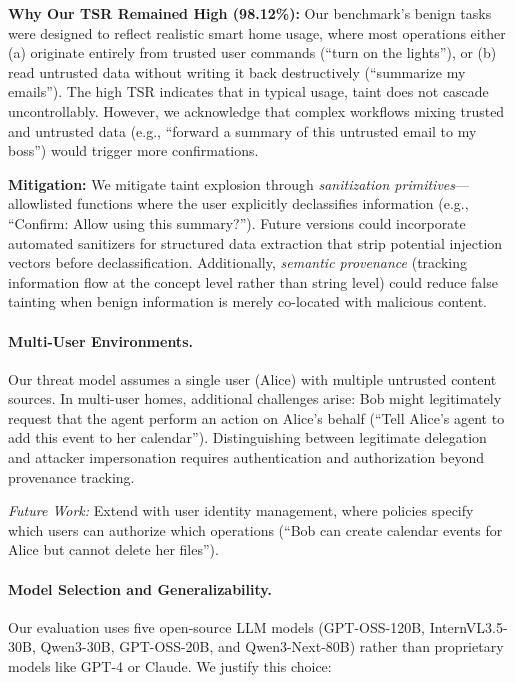 \textbf{Why Our TSR Remained High (98.12\%):} Our benchmark's benign tasks were designed to reflect realistic smart home usage, where most operations either (a) originate entirely from trusted user commands (``turn on the lights''), or (b) read untrusted data without writing it back destructively (``summarize my emails''). The high TSR indicates that in typical usage, taint does not cascade uncontrollably. However, we acknowledge that complex workflows mixing trusted and untrusted data (e.g., ``forward a summary of this untrusted email to my boss'') would trigger more confirmations.

\textbf{Mitigation:} We mitigate taint explosion through \emph{sanitization primitives}---allowlisted functions where the user explicitly declassifies information (e.g., ``Confirm: Allow using this summary?''). Future versions could incorporate automated sanitizers for structured data extraction that strip potential injection vectors before declassification. Additionally, \emph{semantic provenance} (tracking information flow at the concept level rather than string level) could reduce false tainting when benign information is merely co-located with malicious content.

\paragraph{Multi-User Environments.}
Our threat model assumes a single user (Alice) with multiple untrusted content sources. In multi-user homes,
additional challenges arise: Bob might legitimately request that the agent perform an action on Alice's behalf
(``Tell Alice's agent to add this event to her calendar''). Distinguishing between legitimate delegation and
attacker impersonation requires authentication and authorization beyond provenance tracking.

\emph{Future Work:} Extend \sys{} with user identity management, where policies specify which users can
authorize which operations (``Bob can create calendar events for Alice but cannot delete her files'').

\paragraph{Model Selection and Generalizability.}
Our evaluation uses five open-source LLM models (GPT-OSS-120B, InternVL3.5-30B, Qwen3-30B, GPT-OSS-20B, and Qwen3-Next-80B) rather than proprietary models like GPT-4 or Claude. We justify this choice:

